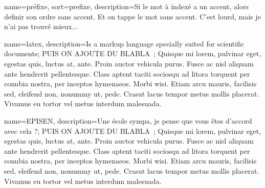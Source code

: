 \makeglossaries


{
    name=préfixe,
    sort=prefixe,
    description={Si le mot à indexé a un accent, alors definir son ordre sans accent. Et on tappe le mot sans accent. C'est lourd, mais je n'ai pas trouvé mieux...}
}


{
    name=latex,
    description={Is a markup language specially suited 
    for scientific documents; PUIS ON AJOUTE DU BLABLA~; Quisque mi lorem, pulvinar eget, egestas quis, luctus at, ante. Proin auctor vehicula purus. Fusce ac nisl aliquam ante hendrerit pellentesque. Class aptent taciti sociosqu ad litora torquent per conubia nostra, per inceptos hymenaeos. Morbi wisi. Etiam arcu mauris, facilisis sed, eleifend non, nonummy ut, pede. Crasut lacus tempor metus mollis placerat. Vivamus eu tortor vel metus interdum malesuada.}
}

{
    name=EPISEN,
    description={Une école sympa, je pense que vous êtes d'accord avec cela ?; PUIS ON AJOUTE DU BLABLA~; Quisque mi lorem, pulvinar eget, egestas quis, luctus at, ante. Proin auctor vehicula purus. Fusce ac nisl aliquam ante hendrerit pellentesque. Class aptent taciti sociosqu ad litora torquent per conubia nostra, per inceptos hymenaeos. Morbi wisi. Etiam arcu mauris, facilisis sed, eleifend non, nonummy ut, pede. Crasut lacus tempor metus mollis placerat. Vivamus eu tortor vel metus interdum malesuada.}
}



